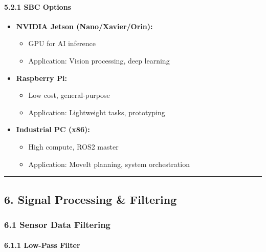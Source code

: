 \documentclass[
]{article}
\providecommand{\tightlist}{%
  \setlength{\itemsep}{0pt}\setlength{\parskip}{0pt}}
\begin{document}
\hypertarget{sbc-options}{%
\paragraph{5.2.1 SBC Options}\label{sbc-options}}

\begin{itemize}
\tightlist
\item
  \textbf{NVIDIA Jetson (Nano/Xavier/Orin):}

  \begin{itemize}
  \tightlist
  \item
    GPU for AI inference
  \item
    Application: Vision processing, deep learning
  \end{itemize}
\item
  \textbf{Raspberry Pi:}

  \begin{itemize}
  \tightlist
  \item
    Low cost, general-purpose
  \item
    Application: Lightweight tasks, prototyping
  \end{itemize}
\item
  \textbf{Industrial PC (x86):}

  \begin{itemize}
  \tightlist
  \item
    High compute, ROS2 master
  \item
    Application: MoveIt planning, system orchestration
  \end{itemize}
\end{itemize}

\begin{center}\rule{0.5\linewidth}{0.5pt}\end{center}

\hypertarget{signal-processing-filtering}{%
\subsection{6. Signal Processing \&
Filtering}\label{signal-processing-filtering}}

\hypertarget{sensor-data-filtering}{%
\subsubsection{6.1 Sensor Data Filtering}\label{sensor-data-filtering}}

\hypertarget{low-pass-filter}{%
\paragraph{6.1.1 Low-Pass Filter}\label{low-pass-filter}}
\end{document}
